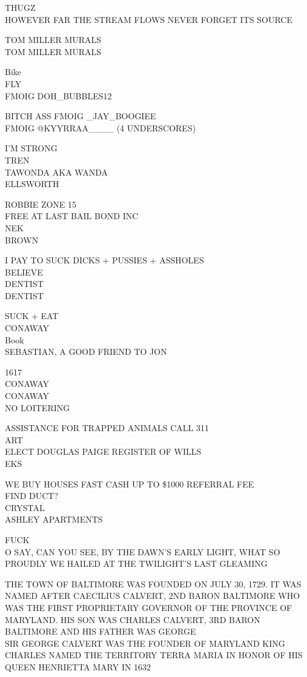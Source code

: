 \documentclass[10pt,letterpaper]{article}
\begin{document}
THUGZ\\
HOWEVER FAR THE STREAM FLOWS NEVER FORGET ITS SOURCE

TOM MILLER MURALS\\
TOM MILLER MURALS

Bike\\
FLY\\
FMOIG DOH\_BUBBLES12

BITCH ASS FMOIG \_JAY\_BOOGIEE\\
FMOIG @KYYRRAA\_\_\_\_ (4 UNDERSCORES)

I'M STRONG\\
TREN\\
TAWONDA AKA WANDA\\
ELLSWORTH

ROBBIE ZONE 15\\
FREE AT LAST BAIL BOND INC\\
NEK\\
BROWN

I PAY TO SUCK DICKS + PUSSIES + ASSHOLES\\
BELIEVE\\
DENTIST\\
DENTIST

SUCK + EAT\\
CONAWAY\\
Book\\
SEBASTIAN, A GOOD FRIEND TO JON

1617\\
CONAWAY\\
CONAWAY\\
NO LOITERING

ASSISTANCE FOR TRAPPED ANIMALS CALL 311\\
ART\\
ELECT DOUGLAS PAIGE REGISTER OF WILLS\\
EKS

WE BUY HOUSES FAST CASH UP TO \$1000 REFERRAL FEE\\
FIND DUCT?\\
CRYSTAL\\
ASHLEY APARTMENTS

FUCK\\
O SAY, CAN YOU SEE, BY THE DAWN'S EARLY LIGHT, WHAT SO PROUDLY WE HAILED AT THE TWILIGHT'S LAST GLEAMING

THE TOWN OF BALTIMORE WAS FOUNDED ON JULY 30, 1729.  IT WAS NAMED AFTER CAECILIUS CALVERT, 2ND BARON BALTIMORE WHO WAS THE FIRST PROPRIETARY GOVERNOR OF THE PROVINCE OF MARYLAND.  HIS SON WAS CHARLES CALVERT, 3RD BARON BALTIMORE AND HIS FATHER WAS GEORGE\\
SIR GEORGE CALVERT WAS THE FOUNDER OF MARYLAND KING CHARLES NAMED THE TERRITORY TERRA MARIA IN HONOR OF HIS QUEEN HENRIETTA MARY IN 1632
\end{document}
